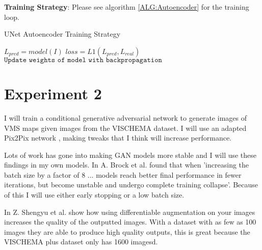 \documentclass{UoYCSproject}
\begin{document}
\textbf{Training Strategy}: Please see algorithm \ref{ALG:Autoencoder} for the training loop.

\begin{algorithm}
\caption{UNet Autoencoder Training Strategy}\label{ALG:Autoencoder}
\begin{algorithmic}[1]
\State
\State $L_{pred} = model(I)$
\State $loss = L1( L_{pred}, L_{real} ) $
\State $\texttt{Update weights of model with backpropagation}$
\State
\EndFor
\EndFor
\end{algorithmic}
\end{algorithm}

\section{Experiment 2}

I will train a conditional generative adversarial network to generate images of VMS maps given images from the VISCHEMA dataset. I will use an adapted Pix2Pix network \cite{isola2018imagetoimage}, making tweaks that I think will increase performance.

Lots of work has gone into making GAN models more stable and I will use these findings in my own models. In \cite{brock2019large} A. Brock et al. found that when 'increasing the batch size by a factor of 8 ... models reach better final performance in fewer iterations, but become unstable and undergo complete training collapse'. Because of this I will use either early stopping or a low batch size. 

In \cite{zhao2020differentiable} Z. Shengyu et al. show how using differentiable augmentation on your images increases the quality of the outputted images. With a dataset with as few as 100 images they are able to produce high quality outputs, this is great because the VISCHEMA plus dataset only has 1600 imagesd.

\end{document}
